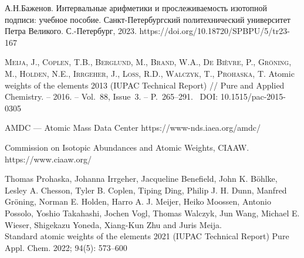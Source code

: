 \documentclass[a5paper,openany]{book}
\begin{document}
\begin{thebibliography}{99}
 А.Н.Баженов. Интервальные арифметики и прослеживаемость изотопной подписи: учебное пособие. Санкт-Петербургский политехнический университет Петра Великого. С.-Петербург, 2023. https://doi.org/10.18720/SPBPU/5/tr23-167 
		
		\textsc{Meija, J., Coplen, T.B., Berglund, M., Brand, W.A., De Bièvre, P., Gröning, M., Holden, N.E., Irrgeher, J., Loss, R.D., Walczyk, T., Prohaska, T.} 
		Atomic weights of the elements 2013 (IUPAC Technical Report) // Pure and Applied Chemistry. -- 2016. -- Vol.~88, Issue~3. -- P.~265--291. \   DOI: 10.1515/pac-2015-0305 
		
		
		
		 AMDC --- Atomic Mass Data Center
		https://www-nds.iaea.org/amdc/
		
		
		
		Commission on Isotopic Abundances and Atomic Weights, CIAAW. https://www.ciaaw.org/
		
		
		
		Thomas Prohaska, Johanna Irrgeher, Jacqueline Benefield, John K. Böhlke,
		Lesley A. Chesson, Tyler B. Coplen, Tiping Ding, Philip J. H. Dunn, Manfred Gröning,
		Norman E. Holden, Harro A. J. Meijer, Heiko Moossen, Antonio Possolo,
		Yoshio Takahashi, Jochen Vogl, Thomas Walczyk, Jun Wang, Michael E. Wieser,
		Shigekazu Yoneda, Xiang-Kun Zhu and Juris Meija. \\
		Standard atomic weights of the elements 2021 (IUPAC Technical Report)	Pure Appl. Chem. 2022; 94(5): 573–600
		

\end{thebibliography}
\end{document}
